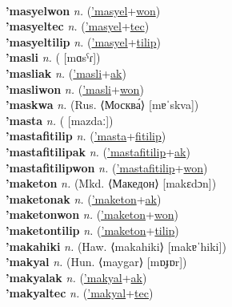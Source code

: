  \label{'masyelak} \\
\textbf{'masyelwon} \textit{n.} (\hyperref['masyel]{'masyel}+\hyperref[won]{won})
 \label{'masyelwon} \\
\textbf{'masyeltec} \textit{n.} (\hyperref['masyel]{'masyel}+\hyperref[tec]{tec})
 \label{'masyeltec} \\
\textbf{'masyeltilip} \textit{n.} (\hyperref['masyel]{'masyel}+\hyperref[tilip]{tilip})
 \label{'masyeltilip} \\
\textbf{'masli} \textit{n.} ( [mɑsˁɾ])
 \label{'masli} \\
\textbf{'masliak} \textit{n.} (\hyperref['masli]{'masli}+\hyperref[ak]{ak})
 \label{'masliak} \\
\textbf{'masliwon} \textit{n.} (\hyperref['masli]{'masli}+\hyperref[won]{won})
 \label{'masliwon} \\
\textbf{'maskwa} \textit{n.} (Rus. ⟨Москва́⟩ [mɐˈskva])
 \label{'maskwa} \\
\textbf{'masta} \textit{n.} ( [mazdaː])
 \label{'masta} \\
\textbf{'mastafitilip} \textit{n.} (\hyperref['masta]{'masta}+\hyperref[fitilip]{fitilip})
 \label{'mastafitilip} \\
\textbf{'mastafitilipak} \textit{n.} (\hyperref['mastafitilip]{'mastafitilip}+\hyperref[ak]{ak})
 \label{'mastafitilipak} \\
\textbf{'mastafitilipwon} \textit{n.} (\hyperref['mastafitilip]{'mastafitilip}+\hyperref[won]{won})
 \label{'mastafitilipwon} \\
\textbf{'maketon} \textit{n.} (Mkd. ⟨Македон⟩ [makɛdɔn])
 \label{'maketon} \\
\textbf{'maketonak} \textit{n.} (\hyperref['maketon]{'maketon}+\hyperref[ak]{ak})
 \label{'maketonak} \\
\textbf{'maketonwon} \textit{n.} (\hyperref['maketon]{'maketon}+\hyperref[won]{won})
 \label{'maketonwon} \\
\textbf{'maketontilip} \textit{n.} (\hyperref['maketon]{'maketon}+\hyperref[tilip]{tilip})
 \label{'maketontilip} \\
\textbf{'makahiki} \textit{n.} (Haw. ⟨makahiki⟩ [makɐˈhiki])
 \label{'makahiki} \\
\textbf{'makyal} \textit{n.} (Hun. ⟨maygar⟩ [mɒɟɒr])
 \label{'makyal} \\
\textbf{'makyalak} \textit{n.} (\hyperref['makyal]{'makyal}+\hyperref[ak]{ak})
 \label{'makyalak} \\
\textbf{'makyaltec} \textit{n.} (\hyperref['makyal]{'makyal}+\hyperref[tec]{tec})
